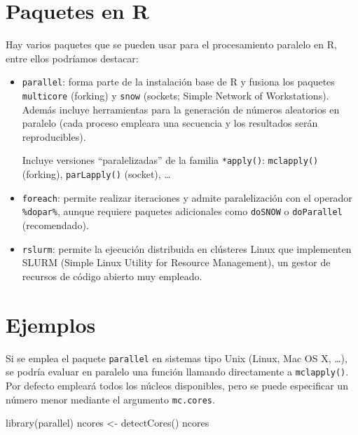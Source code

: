 \documentclass[
]{book}
\newenvironment{Shaded}{\begin{snugshade}}{\end{snugshade}}
\newcommand{\FunctionTok}[1]{\textcolor[rgb]{0.00,0.00,0.00}{#1}}
\newcommand{\NormalTok}[1]{#1}
\newcommand{\OtherTok}[1]{\textcolor[rgb]{0.56,0.35,0.01}{#1}}
\theoremstyle{break}
\theoremstyle{definition}
\theoremstyle{definition}
\theoremstyle{definition}
\theoremstyle{definition}
\theoremstyle{remark}
\begin{document}
\hypertarget{paquetes-en-r}{%
\section{Paquetes en R}\label{paquetes-en-r}}

Hay varios paquetes que se pueden usar para el procesamiento paralelo en R,
entre ellos podríamos destacar:

\begin{itemize}
\item
  \texttt{parallel}: forma parte de la instalación base de R y fusiona los paquetes
  \texttt{multicore} (forking) y \texttt{snow} (sockets; Simple Network of Workstations).
  Además incluye herramientas para la generación de números aleatorios en paralelo
  (cada proceso empleara una secuencia y los resultados serán reproducibles).

  Incluye versiones ``paralelizadas'' de la familia \texttt{*apply()}:
  \texttt{mclapply()} (forking), \texttt{parLapply()} (socket), \ldots{}
\item
  \texttt{foreach}: permite realizar iteraciones y admite paralelización con el operador \texttt{\%dopar\%},
  aunque requiere paquetes adicionales como \texttt{doSNOW} o \texttt{doParallel} (recomendado).
\item
  \texttt{rslurm}: permite la ejecución distribuida en clústeres Linux que implementen
  SLURM (Simple Linux Utility for Resource Management),
  un gestor de recursos de código abierto muy empleado.
\end{itemize}

\hypertarget{ejemplos-3}{%
\section{Ejemplos}\label{ejemplos-3}}

Si se emplea el paquete \texttt{parallel} en sistemas tipo Unix (Linux, Mac OS X, \ldots), se podría
evaluar en paralelo una función llamando directamente a \texttt{mclapply()}.
Por defecto empleará todos los núcleos disponibles, pero se puede especificar un número menor
mediante el argumento \texttt{mc.cores}.

\begin{Shaded}
\begin{Highlighting}[]
\FunctionTok{library}\NormalTok{(parallel)}
\NormalTok{ncores }\OtherTok{\textless{}{-}} \FunctionTok{detectCores}\NormalTok{()}
\NormalTok{ncores}
\end{Highlighting}
\end{Shaded}
\end{document}
